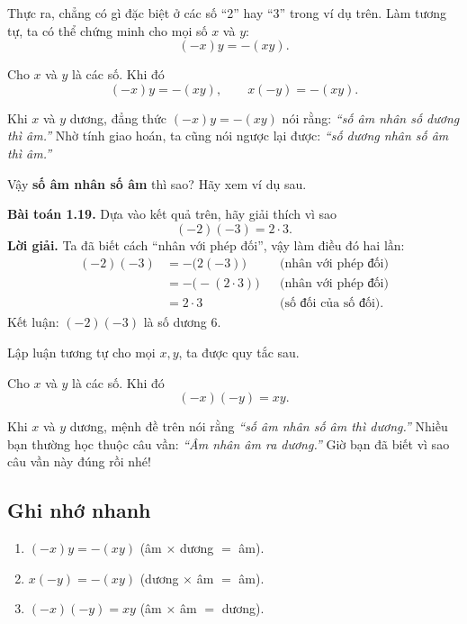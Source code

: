 Thực ra, chẳng có gì đặc biệt ở các số ``2'' hay ``3'' trong ví dụ trên. Làm tương tự, ta có thể chứng minh cho mọi số $x$ và $y$:
\[
(-x)y = -(xy).
\]

\begin{tcolorbox}[title=\textbf{Quan trọng — Nhân với phép đối},colback=white,
  colframe=black!20!gray,sharp corners,boxrule=0.4pt]
Cho $x$ và $y$ là các số. Khi đó
\[
(-x)y = -(xy), \qquad x(-y) = -(xy).
\]
\end{tcolorbox}


Khi $x$ và $y$ dương, đẳng thức $(-x)y = -(xy)$ nói rằng: \emph{``số âm nhân số dương thì âm.''} Nhờ tính giao hoán, ta cũng nói ngược lại được: \emph{``số dương nhân số âm thì âm.''}

\medskip
Vậy \textbf{số âm nhân số âm} thì sao? Hãy xem ví dụ sau.

\textbf{Bài toán 1.19.} Dựa vào kết quả trên, hãy giải thích vì sao
\[
(-2)(-3) = 2\cdot 3.
\]
\textbf{Lời giải.} Ta đã biết cách ``nhân với phép đối'', vậy làm điều đó hai lần:
\[
\begin{aligned}
(-2)(-3) &= -\bigl(2(-3)\bigr) && \text{(nhân với phép đối)}\\
&= -\bigl(-(2\cdot 3)\bigr) && \text{(nhân với phép đối)}\\
&= 2\cdot 3 && \text{(số đối của số đối).}
\end{aligned}
\]
Kết luận: $(-2)(-3)$ là số dương $6$.

Lập luận tương tự cho mọi $x,y$, ta được quy tắc sau.

\begin{tcolorbox}[title=\textbf{Quan trọng — Âm nhân âm},colback=white,
  colframe=black!20!gray,sharp corners,boxrule=0.4pt]
Cho $x$ và $y$ là các số. Khi đó
\[
(-x)(-y) = xy.
\]
\end{tcolorbox}


Khi $x$ và $y$ dương, mệnh đề trên nói rằng \emph{``số âm nhân số âm thì dương.''} Nhiều bạn thường học thuộc câu vần: \emph{``Âm nhân âm ra dương.''} Giờ bạn đã biết vì sao câu vần này đúng rồi nhé!


\subsection*{Ghi nhớ nhanh}
\begin{enumerate}[leftmargin=*]
  \item $(-x)y = -(xy)$ \quad (âm $\times$ dương $=$ âm).
  \item $x(-y) = -(xy)$ \quad (dương $\times$ âm $=$ âm).
  \item $(-x)(-y) = xy$ \quad (âm $\times$ âm $=$ dương).
\end{enumerate}

